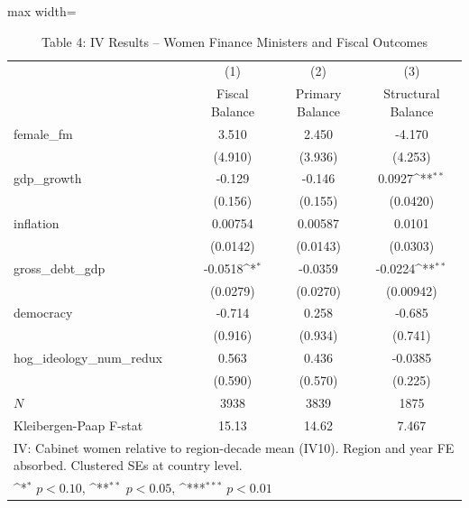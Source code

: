 \begin{table}[htbp]\centering
\def\sym#1{\ifmmode^{#1}\else\(^{#1}\)\fi}
\caption{Table 4: IV Results -- Women Finance Ministers and Fiscal Outcomes}
\begin{adjustbox}{max width=\textwidth}
\small
\begin{tabular}{l*{3}{c}}
\hline\hline
            &\multicolumn{1}{c}{(1)}&\multicolumn{1}{c}{(2)}&\multicolumn{1}{c}{(3)}\\
            &\multicolumn{1}{c}{Fiscal Balance}&\multicolumn{1}{c}{Primary Balance}&\multicolumn{1}{c}{Structural Balance}\\
\hline
female\_fm   &       3.510         &       2.450         &      -4.170         \\
            &     (4.910)         &     (3.936)         &     (4.253)         \\
[1em]
gdp\_growth  &      -0.129         &      -0.146         &      0.0927\sym{**} \\
            &     (0.156)         &     (0.155)         &    (0.0420)         \\
[1em]
inflation   &     0.00754         &     0.00587         &      0.0101         \\
            &    (0.0142)         &    (0.0143)         &    (0.0303)         \\
[1em]
gross\_debt\_gdp&     -0.0518\sym{*}  &     -0.0359         &     -0.0224\sym{**} \\
            &    (0.0279)         &    (0.0270)         &   (0.00942)         \\
[1em]
democracy   &      -0.714         &       0.258         &      -0.685         \\
            &     (0.916)         &     (0.934)         &     (0.741)         \\
[1em]
hog\_ideology\_num\_redux&       0.563         &       0.436         &     -0.0385         \\
            &     (0.590)         &     (0.570)         &     (0.225)         \\
\hline
\(N\)       &        3938         &        3839         &        1875         \\
Kleibergen-Paap F-stat&       15.13         &       14.62         &       7.467         \\
\hline\hline
\multicolumn{4}{l}{\footnotesize IV: Cabinet women relative to region-decade mean (IV10).  Region and year FE absorbed. Clustered SEs at country level.}\\
\multicolumn{4}{l}{\footnotesize \sym{*} \(p<0.10\), \sym{**} \(p<0.05\), \sym{***} \(p<0.01\)}\\
\end{tabular}
\end{adjustbox}
\end{table}
